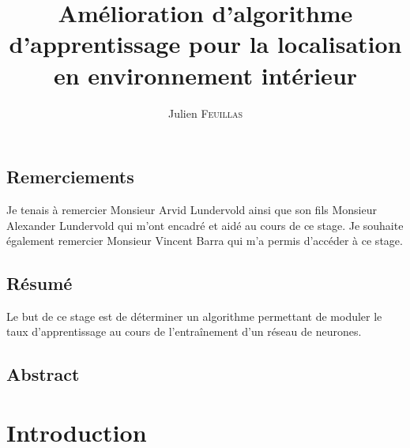 \documentclass{book}
\title{Amélioration d'algorithme d'apprentissage pour la localisation en environnement intérieur}
\author{Julien \textsc{Feuillas}}
\begin{document}
\mainmatter

\pagedegarde

\thispagestyle{empty}
\pagestyle{plain}

\cleardoublepage
\renewcommand{\cleardoublepage}{\clearpage}

\section*{Remerciements}
Je tenais à remercier Monsieur Arvid Lundervold ainsi que son fils Monsieur Alexander Lundervold qui m'ont encadré et aidé au cours de ce stage. Je souhaite également remercier Monsieur Vincent Barra qui m'a permis d'accéder à ce stage.
\clearpage

\section*{Résumé}
Le but de ce stage est de déterminer un algorithme permettant de moduler le \og{}taux d'apprentissage\fg{} au cours de l'entraînement d'un réseau de neurones.

\section*{Abstract}

\setcounter{tocdepth}{3}
\renewcommand{\contentsname}{Table des matières}
\tableofcontents
{}

\clearpage

\begingroup
\let\clearpage\relax
\listoftables
{}
\listoffigures
{}
\endgroup

\clearpage

\chapter*{Introduction}

\backmatter


\printindex
{}


\nocite{*}


\end{document}
